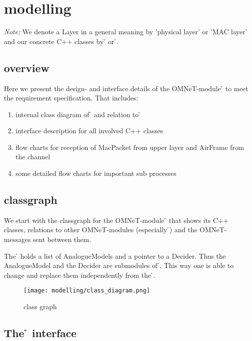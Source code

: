\section{modelling}

\emph{Note: }We denote a Layer in a general meaning by 'physical layer' 
or 'MAC layer' and our concrete C++ classes by \h{\bp} or \h{\bm}.

\subsection{overview}

Here we present the design- and interface details of the OMNeT-module 
\h{\bp} to meet the requirement specification. That includes:

\begin{enumerate}
 \item internal class diagram of \h{\bp} and relation to \h{\bm}
 \item interface description for all involved C++ classes
 \item flow charts for reception of MacPacket from upper layer and 
 AirFrame from the channel
 \item some detailed flow charts for important sub processes
\end{enumerate}


\subsection{classgraph}

We start with the classgraph for the OMNeT-module \h{\bp} that shows 
its C++ classes, relations to other OMNeT-modules (especially \h{\bm})
and the OMNeT-messages sent between them.

The \h{\bp} holds a list of AnalogueModels and a pointer to a
Decider. Thus the AnalogueModel and the Decider are submodules of \h{\bp}. This
way one is able to change and
replace them independently from
the \h{\bp}.

\begin{figure}[H]
 \centering
 \texttt{[image: modelling/class\_diagram.png]}
 \caption{class graph}
 \label{fig: classgraph}
\end{figure}


\subsection{The \h{\bp} interface}


